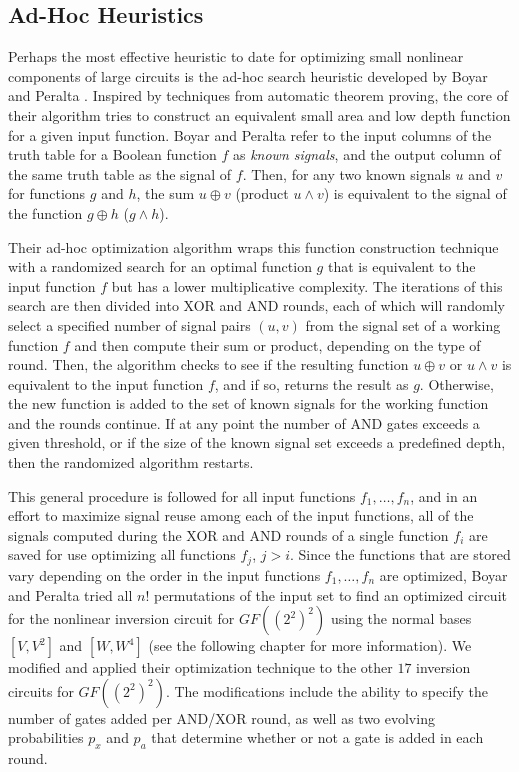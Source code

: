 \subsection{Ad-Hoc Heuristics}
Perhaps the most effective heuristic to date for optimizing small nonlinear components of large circuits is the ad-hoc search heuristic developed by Boyar and Peralta \cite{Boyar12-1}. Inspired by techniques from automatic theorem proving, the core of their algorithm tries to construct an equivalent small area and low depth function for a given input function. Boyar and Peralta refer to the input columns of the truth table for a Boolean function $f$ as \emph{known signals}, and the output column of the same truth table as the signal of $f$. Then, for any two known signals $u$ and $v$ for functions $g$ and $h$, the sum $u \oplus v$ (product $u \land v$) is equivalent to the signal of the function $g \oplus h$ ($g \land h$). 

Their ad-hoc optimization algorithm wraps this function construction technique with a randomized search for an optimal function $g$ that is equivalent to the input function $f$ but has a lower multiplicative complexity. The iterations of this search are then divided into XOR and AND rounds, each of which will randomly select a specified number of signal pairs $(u, v)$ from the signal set of a working function $f$ and then compute their sum or product, depending on the type of round. Then, the algorithm checks to see if the resulting function $u \oplus v$ or $u \land v$ is equivalent to the input function $f$, and if so, returns the result as $g$. Otherwise, the new function is added to the set of known signals for the working function and the rounds continue. If at any point the number of AND gates exceeds a given threshold, or if the size of the known signal set exceeds a predefined depth, then the randomized algorithm restarts. 

This general procedure is followed for all input functions $f_1,\dots,f_n$, and in an effort to maximize signal reuse among each of the input functions, all of the signals computed during the XOR and AND rounds of a single function $f_i$ are saved for use optimizing all functions $f_j$, $j > i$. Since the functions that are stored vary depending on the order in the input functions $f_1,\dots,f_n$ are optimized, Boyar and Peralta tried all $n!$ permutations of the input set to find an optimized circuit for the nonlinear inversion circuit for $GF((2^2)^2)$ using the normal bases $[V, V^2]$ and $[W, W^4]$ (see the following chapter for more information). We modified and applied their optimization technique to the other $17$ inversion circuits for $GF((2^2)^2)$. The modifications include the ability to specify the number of gates added per AND/XOR round, as well as two evolving probabilities $p_x$ and $p_a$ that determine whether or not a gate is added in each round.

